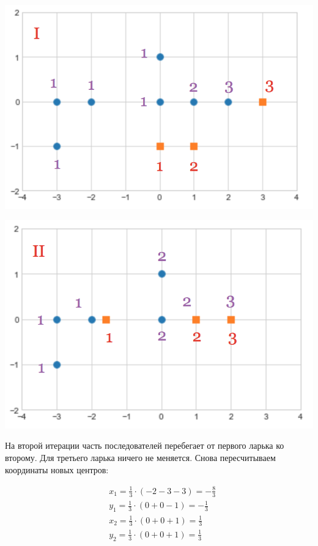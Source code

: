 \documentclass[12pt, a4paper, oneside]{article}
\begin{document}
{\begin{enumerate}
\begin{minipage}[t]{0.45\textwidth}
\includegraphics[scale=0.25]{k_means_b1.png}
\end{minipage}
\hfill
\begin{minipage}[t]{0.45\textwidth}
	\includegraphics[scale=0.25]{k_means_b2.png}
\end{minipage}

На второй итерации часть последователей перебегает от первого ларька ко второму. Для третьего ларька ничего не меняется. Снова пересчитываем координаты новых центров: 

\begin{equation}
\begin{aligned}
& x_1 = \frac{1}{3} \cdot (-2 -3 -3) = - \frac{8}{3} \\ 
& y_1 = \frac{1}{3} \cdot (0 + 0 - 1 ) = -\frac{1}{3} \\ 
& x_2 = \frac{1}{3} \cdot (0 + 0 + 1) =  \frac{1}{3} \\ 
& y_2 = \frac{1}{3} \cdot (0 + 0 + 1) =  \frac{1}{3} \\ 
\end{aligned}
\end{equation}


\end{enumerate}}
\end{document}
